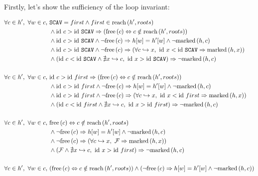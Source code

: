 \begin{lemma}
  Firstly, let's show the sufficiency of the loop invariant:

  \begin{align*}
    \forall c \in h',\ \forall w \in c,\ &\mathtt{SCAV} = first \land
      first \in \reach{h'}{roots}\\
%
    &\land \id~c > \id~\mathtt{SCAV} \implies (\free{c}
      \iff c \notin \reach{h'}{roots})\\
%
    &\land \id~c > \id~\mathtt{SCAV} \land \lnot\free{c}
      \implies h[w] = h'[w] \land \lnot \marked{h}{c}\\
%
    &\land \id~c > \id~\mathtt{SCAV} \land \lnot\free{c}
      \implies (\forall c \pointsto x,\ \id~x < \id~\mathtt{SCAV}
      \implies \marked{h}{x})\\
%
    &\land \left(\id~c < \id~\mathtt{SCAV} \land \nexists x \pointsto
      c,\ \id~x > \id~\mathtt{SCAV}\right) \implies
      \lnot\marked{h}{c}\\\\
%
%
    \forall c \in h',\ \forall w \in c,\ & \id~c > \id~first \implies
      (\free{c} \iff c \notin \reach{h'}{roots})\\
%
    &\land \id~c > \id~first \land \lnot\free{c}
      \implies h[w] = h'[w] \land \lnot \marked{h}{c}\\
%
    &\land \id~c > \id~first \land \lnot\free{c}
      \implies (\forall c \pointsto x,\ \id~x < \id~first
      \implies \marked{h}{x})\\
%
    &\land \left(\id~c < \id~first \land \nexists x \pointsto
      c,\ \id~x > \id~first\right) \implies
      \lnot\marked{h}{c}\\\\
%
%
    \forall c \in h',\ \forall w \in c,\ & \free{c} \iff c \notin
      \reach{h'}{roots}\\
%
    &\land \lnot\free{c} \implies h[w] = h'[w] \land \lnot \marked{h}{c}\\
%
    &\land \lnot\free{c} \implies (\forall c \pointsto x,\
    \lfalse \implies \marked{h}{x})\\
%
    &\land \left(\lfalse \land \nexists x \pointsto
      c,\ \id~x > \id~first\right) \implies
      \lnot\marked{h}{c}\\\\
%
%
    \forall c \in h',\ \forall w \in c,\ & (\free{c} \iff c \notin
      \reach{h'}{roots}) \land (\lnot\free{c} \implies h[w] = h'[w] \land
      \lnot \marked{h}{c})
  \end{align*}


\end{lemma}
